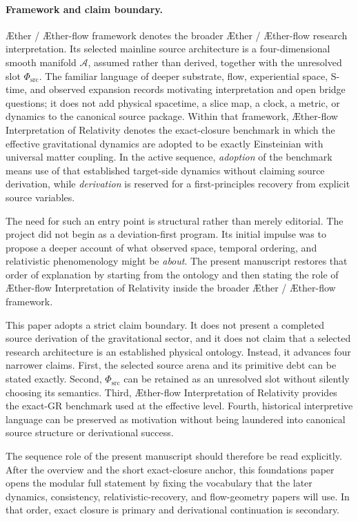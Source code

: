 \documentclass[11pt]{article}
\newcommand{\Aether}{\AE{}ther}
\newcommand{\Aflow}{\AE{}ther-flow}
\newcommand{\TheoryName}{\Aflow{} Interpretation of Relativity}
\newcommand{\TheoryProgram}{\Aether{} / \Aflow{} framework}
\newcommand{\Sub}{\mathcal{A}}
\newcommand{\PhiSrc}{\Phi_{\mathrm{src}}}
\begin{document}
\paragraph{Framework and claim boundary.}
\TheoryProgram{} denotes the broader \Aether{} / \Aflow{} research interpretation. Its selected mainline source architecture is a four-dimensional smooth manifold \(\Sub\), assumed rather than derived, together with the unresolved slot \(\PhiSrc\). The familiar language of deeper substrate, flow, experiential space, S-time, and observed expansion records motivating interpretation and open bridge questions; it does not add physical spacetime, a slice map, a clock, a metric, or dynamics to the canonical source package. Within that framework, \TheoryName{} denotes the exact-closure benchmark in which the effective gravitational dynamics are adopted to be exactly Einsteinian with universal matter coupling. In the active sequence, \emph{adoption} of the benchmark means use of that established target-side dynamics without claiming source derivation, while \emph{derivation} is reserved for a first-principles recovery from explicit source variables.

The need for such an entry point is structural rather than merely editorial. The project did not begin as a deviation-first program. Its initial impulse was to propose a deeper account of what observed space, temporal ordering, and relativistic phenomenology might be \emph{about}. The present manuscript restores that order of explanation by starting from the ontology and then stating the role of \TheoryName{} inside the broader \TheoryProgram{}.

This paper adopts a strict claim boundary. It does not present a completed source derivation of the gravitational sector, and it does not claim that a selected research architecture is an established physical ontology. Instead, it advances four narrower claims. First, the selected source arena and its primitive debt can be stated exactly. Second, \(\PhiSrc\) can be retained as an unresolved slot without silently choosing its semantics. Third, \TheoryName{} provides the exact-GR benchmark used at the effective level. Fourth, historical interpretive language can be preserved as motivation without being laundered into canonical source structure or derivational success.

The sequence role of the present manuscript should therefore be read explicitly. After the overview and the short exact-closure anchor, this foundations paper opens the modular full statement by fixing the vocabulary that the later dynamics, consistency, relativistic-recovery, and flow-geometry papers will use. In that order, exact closure is primary and derivational continuation is secondary.
\end{document}
